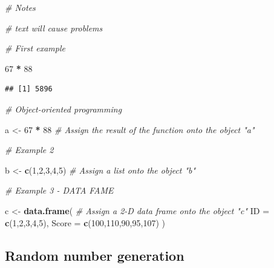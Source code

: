 \documentclass[
]{book}
\newenvironment{Shaded}{\begin{snugshade}}{\end{snugshade}}
\newcommand{\AttributeTok}[1]{\textcolor[rgb]{0.13,0.29,0.53}{#1}}
\newcommand{\CommentTok}[1]{\textcolor[rgb]{0.56,0.35,0.01}{\textit{#1}}}
\newcommand{\DecValTok}[1]{\textcolor[rgb]{0.00,0.00,0.81}{#1}}
\newcommand{\FunctionTok}[1]{\textcolor[rgb]{0.13,0.29,0.53}{\textbf{#1}}}
\newcommand{\NormalTok}[1]{#1}
\newcommand{\OtherTok}[1]{\textcolor[rgb]{0.56,0.35,0.01}{#1}}
\newcommand{\SpecialCharTok}[1]{\textcolor[rgb]{0.81,0.36,0.00}{\textbf{#1}}}
\begin{document}
\begin{Shaded}
\begin{Highlighting}[]
\CommentTok{\# Notes }

\CommentTok{\# text will cause problems }

\CommentTok{\# First example }

\DecValTok{67} \SpecialCharTok{*} \DecValTok{88}
\end{Highlighting}
\end{Shaded}

\begin{verbatim}
## [1] 5896
\end{verbatim}

\begin{Shaded}
\begin{Highlighting}[]
\CommentTok{\# Object{-}oriented programming }

\NormalTok{a }\OtherTok{\textless{}{-}} \DecValTok{67} \SpecialCharTok{*} \DecValTok{88} \CommentTok{\# Assign the result of the function onto the object "a"}

\CommentTok{\# Example 2 }

\NormalTok{b }\OtherTok{\textless{}{-}} \FunctionTok{c}\NormalTok{(}\DecValTok{1}\NormalTok{,}\DecValTok{2}\NormalTok{,}\DecValTok{3}\NormalTok{,}\DecValTok{4}\NormalTok{,}\DecValTok{5}\NormalTok{) }\CommentTok{\# Assign a list onto the object "b"}

\CommentTok{\# Example 3 {-} DATA FAME }

\NormalTok{c }\OtherTok{\textless{}{-}} \FunctionTok{data.frame}\NormalTok{( }\CommentTok{\# Assign a 2{-}D data frame onto the object "c"}
  \AttributeTok{ID =} \FunctionTok{c}\NormalTok{(}\DecValTok{1}\NormalTok{,}\DecValTok{2}\NormalTok{,}\DecValTok{3}\NormalTok{,}\DecValTok{4}\NormalTok{,}\DecValTok{5}\NormalTok{), }
  \AttributeTok{Score =} \FunctionTok{c}\NormalTok{(}\DecValTok{100}\NormalTok{,}\DecValTok{110}\NormalTok{,}\DecValTok{90}\NormalTok{,}\DecValTok{95}\NormalTok{,}\DecValTok{107}\NormalTok{)}
\NormalTok{)}
\end{Highlighting}
\end{Shaded}

\subsection*{Random number generation}\label{random-number-generation}
\end{document}
